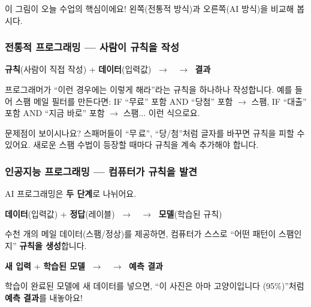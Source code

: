 \documentclass[11pt,a4paper]{article}
\begin{document}
이 그림이 오늘 수업의 핵심이에요! 왼쪽(전통적 방식)과 오른쪽(AI 방식)을 비교해 봅시다.

\subsubsection{전통적 프로그래밍 — 사람이 규칙을 작성}

\begin{tcolorbox}[colback=lightgray, colframe=darkgray!60, title={\emoji{desktop-computer} 전통적 프로그래밍}, fonttitle=\bfseries, rounded corners, boxrule=1pt]
\centering\large
\textbf{규칙}(사람이 직접 작성) + \textbf{데이터}(입력값) $\;\to\;$  $\;\to\;$ \textbf{결과}
\end{tcolorbox}

프로그래머가 ``이런 경우에는 이렇게 해라''라는 규칙을 하나하나 작성합니다. 예를 들어 스팸 메일 필터를 만든다면: IF ``무료'' 포함 AND ``당첨'' 포함 $\to$ 스팸, IF ``대출'' 포함 AND ``지금 바로'' 포함 $\to$ 스팸... 이런 식으로요.

문제점이 보이시나요? 스패머들이 ``무\,료'', ``당/첨''처럼 글자를 바꾸면 규칙을 피할 수 있어요. 새로운 스팸 수법이 등장할 때마다 규칙을 계속 추가해야 합니다.

\subsubsection{인공지능 프로그래밍 — 컴퓨터가 규칙을 발견}

AI 프로그래밍은 \textbf{두 단계}로 나뉘어요.

\begin{tcolorbox}[colback=lightblue!40, colframe=primary, title={\emoji{brain} ① 학습 단계 (Learning)}, fonttitle=\bfseries, rounded corners, boxrule=1pt]
\centering\large
\textbf{데이터}(입력값) + \textbf{정답}(레이블) $\;\to\;$  $\;\to\;$ \textbf{모델}(학습된 규칙)

\vspace{0.3cm}
\small 수천 개의 메일 데이터(스팸/정상)를 제공하면, 컴퓨터가 스스로 ``어떤 패턴이 스팸인지'' \textbf{규칙을 생성}합니다.
\end{tcolorbox}

\vspace{0.3cm}

\begin{tcolorbox}[colback=lightteal!40, colframe=teal, title={\emoji{crystal-ball} ② 추론 단계 (Inference)}, fonttitle=\bfseries, rounded corners, boxrule=1pt]
\centering\large
\textbf{새 입력} + \textbf{학습된 모델} $\;\to\;$  $\;\to\;$ \textbf{예측 결과}

\vspace{0.3cm}
\small 학습이 완료된 모델에 새 데이터를 넣으면, ``이 사진은 아마 고양이입니다 (95\%)''처럼 \textbf{예측 결과}를 내놓아요!
\end{tcolorbox}
\end{document}
